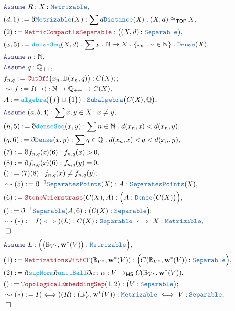 \documentclass[12pt]{scrartcl}
\newcommand{\TYPE}[1]{\textcolor{NavyBlue}{\mathtt{#1}}}
\newcommand{\FUNC}[1]{\textcolor{Cerulean}{\mathtt{#1}}}
\newcommand{\LOGIC}[1]{\textcolor{Blue}{\mathtt{#1}}}
\newcommand{\THM}[1]{\textcolor{Maroon}{\mathtt{#1}}}
\renewcommand{\.}{\; . \;}
\newcommand{\de}{: \kern 0.1pc =}
\newcommand{\Page}[1]{\begin{align*} #1 \end{align*} \newpage   }
\newcommand{ \bd }{ \ByDef }
\newcommand{\Rats}{\mathbb{Q} }
\newcommand{\Nat}{\mathbb{N} }
\newcommand{\Say}[3]{& #1 \de #2 : #3, \\}
\newcommand{\Conclude}[3]{& #1 \de #2 : #3; \\}
\newcommand{\Derive}[3]{& \leadsto #1 \de #2 : #3, \\}
\newcommand{\DeriveConclude}[3]{& \leadsto #1 \de #2 : #3 ; \\}
\newcommand{\A}{\LOGIC{Assume} \;}
\newcommand{\Assume}[2]{& \A #1 : #2, \\}
\newcommand{\QED}{\; \square}
\newcommand{\EndProof}{& \QED \\}
\newcommand{\ByDef}{\eth}
\newcommand{\TOP}{ \mathsf{TOP}  }
\begin{document}
\Page{
\Assume{R}{X : \TYPE{Metrizable}}
\Say{(d,1)}{\bd \TYPE{Metrizable}(X)}{\sum d  \TYPE{Distance}(X) \. (X,d) \cong_\TOP X}
\Say{(2)}{\THM{MetricCompactIsSeparable}}{ \big( (X,d) : \TYPE{Separable} \big)  }
\Say{(x,3)}{\FUNC{denseSeq}(X,d)}{\sum x : \Nat \to X \. \{ x_n :  n \in \Nat  \} : \TYPE{Dense}(X) }
\Assume{n}{\Nat}
\Assume{q}{\Rats_{++}}
\Conclude{f_{n,q}}{ \THM{CutOff}\big(x_n,\mathbb{B}(x_n,q)\big)}{ C(X); }
\Derive{f}{I(\to)}{ \Nat \to \Rats_{++} \to C(X)}
\Say{A}{\FUNC{algebra}(\{f\} \cup \{1\})}{ \TYPE{Subalgebra}\big( C(X), \Rats \big) }
\Assume{(a,b,4)}{ \sum x,y \in  X \. x \neq y}
\Say{(n,5)}{ \bd \FUNC{denseSeq}(x,y)}{ \sum n \in \Nat \. d(x_n,x) < d(x_n,y)  }
\Say{(q,6)}{ \bd \TYPE{Dense}(x,y) }{ \sum q \in \Rats \. d(x_n,x) < q < d(x_n,y) }
\Say{(7)}{ \bd f_{n,q}(x)(6) }{ f_{n,q}(x) > 0 }
\Say{(8)}{\bd f_{n,q}(x)(6)}{ f_{n,q}(y) = 0}
\Conclude{()}{(7)(8)}{f_{n,q}(x) \neq f_{n,q}(y)}
\Derive{(5)}{\bd^{-1}\TYPE{SeparatesPoints}(X)}{ A : \TYPE{SeparatesPoints}(X)}
\Say{(6)}{ \THM{StoneWeierstrass}(C(X),A)}{ \Big(A : \TYPE{Dense}\big( C(X) \big)\Big)}
\Conclude{()}{\bd^{-1} \TYPE{Separable}(A,6) }{\big( C(X) : \TYPE{Separable} \big)}
\Derive{(*)}{I(\iff)(L)}{C(X) : \TYPE{Separable} \iff X : \TYPE{Metrizable}}
\EndProof
\Assume{L}{ \Big( \big(\mathbb{B}_{V^*}, \mathbf{w}^*(V)\big) : \TYPE{Metrizable}\Big) }
\Say{(1)}{\THM{MetrizationsWithCF}(\mathbb{B}_{V^*}, \mathbf{w}^*(V))}{ \Big( C(\mathbb{B}_{V^*}, \mathbf{w}^*(V)) : \TYPE{Separable} \Big)   }
\Say{(2)}{\bd \FUNC{supNorm} \bd \FUNC{unitBall} \bd \alpha }{\alpha : V \to_\mathsf{MS} C(\mathbb{B}_{V^*}, \mathbf{w}^*(V))}
\Conclude{()}{ \THM{TopologicalEmbeddingSep}(1,2)}{\big(V : \TYPE{Separable} \big)}
\DeriveConclude{(*)}{I(\iff)(R)}{(\mathbb{B}_V^*,\mathbf{w}^*(V)) : \TYPE{Metrizable} \iff V : \TYPE{Separable}}
\EndProof
}
\end{document}
